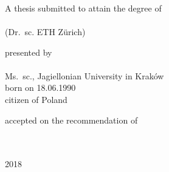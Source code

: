 
\begin{titlepage}

\begin{addmargin}[-1cm]{-3cm}
\begin{center}
\large

\hfill
\vfill


\vfill

\begingroup
\color{Maroon}
\\
\\
 \\
\bigskip %
\endgroup

\vfill

A thesis submitted to attain the degree of \\
\bigskip
{} \\
\smallskip
(Dr.\ sc. ETH Zürich)

\vfill

presented by \\
\bigskip
\spacedallcaps{\myName} \\
\bigskip
Ms.\ sc., Jagiellonian University in Kraków \\
\medskip
born on 18.06.1990 \\
\medskip
citizen of Poland

\vfill

accepted on the recommendation of \\
\bigskip
{} \\
 \\

\vfill

2018

\vfill

\end{center}
\end{addmargin}

\end{titlepage}
